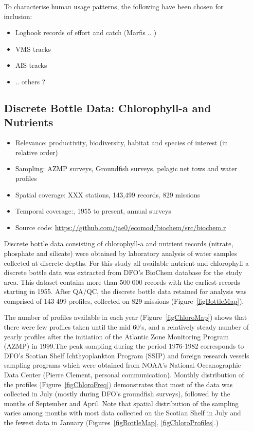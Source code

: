 \documentclass[letterpaper,portrait,11pt]{scrartcl}
\numberwithin{equation}{section}		%
\numberwithin{figure}{section}			%
\numberwithin{table}{section}				%
\begin{document}
To characterise human usage patterns, the following have been chosen for inclusion:

\begin{itemize}
	\item Logbook records of effort and catch (Marfis .. )
  \item VMS tracks
  \item AIS tracks
  \item ..  others ?
\end{itemize}

\subsection{Discrete Bottle Data: Chlorophyll-a and Nutrients}

\begin{itemize}
  \item Relevance:  productivity, biodiversity, habitat and species of interest (in relative order)
  \item Sampling:  AZMP surveys, Groundfish surveys, pelagic net tows and water profiles
  \item Spatial coverage: XXX stations, 143,499 records, 829 missions
  \item Temporal coverage:,  1955 to present, annual surveys
  \item Source code: \url{https://github.com/jae0/ecomod/biochem/src/biochem.r}
\end{itemize}

Discrete bottle data consisting of chlorophyll-a and nutrient records (nitrate, phosphate and silicate) were obtained by laboratory analysis of water samples collected at discrete depths. For this study all available nutrient and chlorophyll-a discrete bottle data was extracted from DFO's BioChem database for the study area. This dataset contains more than 500 000 records with the earliest records starting in 1955. After QA/QC, the discrete bottle data retained for analysis was comprised of 143 499 profiles, collected on 829 missions (Figure~\ref{figBottleMap}).



The number of profiles available in each year (Figure~\ref{figChloroMap}) shows that there were few profiles taken until the mid 60's, and a relatively steady number of yearly profiles after the initiation of the Atlantic Zone Monitoring Program (AZMP) in 1999.The peak sampling during the period 1976-1982 corresponds to DFO's Scotian Shelf Ichthyoplankton Program (SSIP) and foreign research vessels sampling programs which were obtained from NOAA's National Oceanographic Data Center (Pierre Clement, personal communication).  Monthly distribution of the profiles (Figure~\ref{figChloroFreq})  demonstrates that most of the data was collected in July (mostly during DFO's groundfish surveys), followed by the months of September and April. Note that spatial distribution of the sampling varies among months with most data collected on the Scotian Shelf in July and the fewest data in January (Figures~\ref{figBottleMap}, \ref{figChloroProfiles}.)
\end{document}
